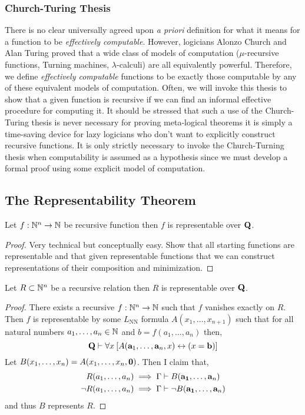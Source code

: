 \documentclass[12pt]{article}
\newcommand{\uq}[1]{\forall{#1} \:}
\begin{document}
\subsubsection{Church-Turing Thesis}

There is no clear universally agreed upon \textit{a priori} definition for what it means for a function to be \textit{effectively computable}. However, logicians Alonzo Church and Alan Turing proved that a wide class of models of computation ($\mu$-recursive functions, Turning machines, $\lambda$-calculi) are all equivalently powerful. Therefore, we define \textit{effectively computable} functions to be exactly those computable by any of these equivalent models of computation. Often, we will invoke this thesis to show that a given function is recursive if we can find an informal effective procedure for computing it. It should be stressed that such a use of the Church-Turing thesis is never necessary for proving meta-logical theorems it is simply a time-saving device for lazy logicians who don't want to explicitly construct recursive functions. It is only strictly necessary to invoke the Church-Turning thesis when computability is assumed as a hypothesis since we must develop a formal proof using some explicit model of computation. 
  
\subsection{The Representability Theorem}

\begin{theorem}
Let $f : \N^n \to \N$ be recursive function then $f$ is representable over $\bf{Q}$. 
\end{theorem}

\begin{proof}
Very technical but conceptually easy. Show that all starting functions are representable and that given representable functions that we can construct representations of their composition and minimization. 
\end{proof}

\begin{corollary}
Let $R \subset \N^n$ be a recursive relation then $R$ is representable over $\bf{Q}$.
\end{corollary}

\begin{proof}
There exists a recursive $f : \N^n \to \N$ such that $f$ vanishes exactly on $R$. Then $f$ is representable by some $L_{\text{NN}}$ formula $A(x_1, \dots, x_{n+1})$ such that for all natural numbers $a_1, \dots, a_n \in \N$ and $b = f(a_1, \dots, a_n)$ then,
\[ \bf{Q} \proves \uq{x} [ A(\bf{a}_1, \dots, \bf{a}_n, x) \leftrightarrow (x = \bf{b}) ] \] 
Let $B(x_1, \dots, x_n) = A(x_1, \dots, x_n, \bf{0})$. Then I claim that,
\begin{align*}
R(a_1, \dots, a_n) & \implies \Gamma \proves B(\bf{a_1}, \dots, \bf{a}_n)
\\
\neg R(a_1, \dots, a_n) & \implies \Gamma \proves \neg B(\bf{a_1}, \dots, \bf{a}_n)
\end{align*}
and thus $B$ represents $R$. 
\end{proof}
\end{document}
